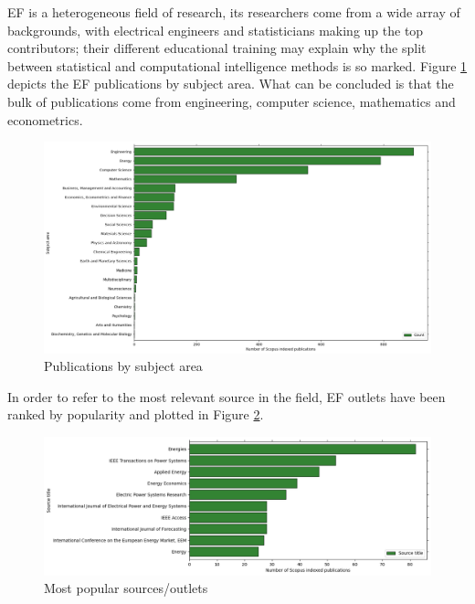 EF is a heterogeneous field of research, its researchers come from a wide array of backgrounds, with electrical engineers and statisticians making up the top contributors; their different educational training may explain why the split between statistical and computational intelligence methods is so marked. Figure \ref{fig:subject_area} depicts the EF publications by subject area. What can be concluded is that the bulk of publications come from engineering, computer science, mathematics and econometrics.
\begin{figure}
  \includegraphics[width=\textwidth]{images/subject_area.png}
  \caption{Publications by subject area}
  \label{fig:subject_area}
\end{figure}

In order to refer to the most relevant source in the field, EF outlets have been ranked by popularity and plotted in Figure \ref{fig:src_title}.
\begin{figure}
  \includegraphics[width=\textwidth]{images/src_title.png}
  \caption{Most popular sources/outlets}
  \label{fig:src_title}
\end{figure}

